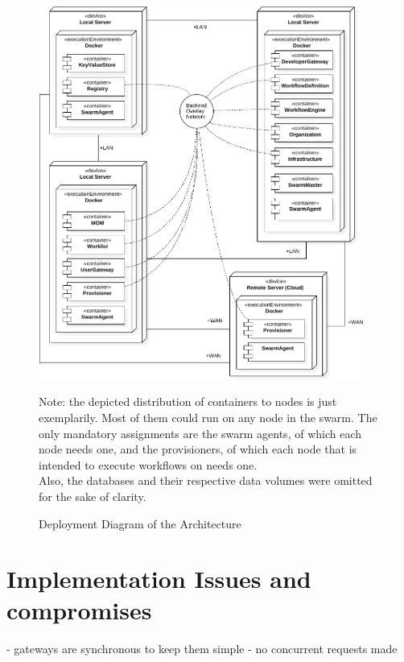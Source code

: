 \begin{figure}[htbp]
  \centering
  \includegraphics[width=0.95\textwidth]{content/images/Architecture-crop.pdf}
  \caption*{\scriptsize Note: the depicted distribution of containers to nodes is just exemplarily. Most of them could run on any node in the swarm. The only mandatory assignments are the swarm agents, of which each node needs one, and the provisioners, of which each node that is intended to execute workflows on needs one. \\ Also, the databases and their respective data volumes were omitted for the sake of clarity.}
  \caption{Deployment Diagram of the Architecture}
  \label{fig:label}
\end{figure}

\section{Implementation Issues and compromises} %
  - gateways are synchronous to keep them simple
    - no concurrent requests made
\label{sec:implementation_issues}

